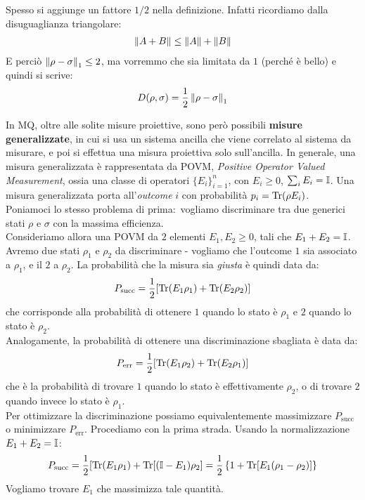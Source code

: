 \documentclass[../../InformazioneQuantistica.tex]{subfiles}
\begin{document}
Spesso si aggiunge un fattore $1/2$ nella definizione. Infatti ricordiamo dalla disuguaglianza triangolare:
\begin{align*}
\left\lVert A + B\right\rVert \leq \left\lVert A\right\rVert + \left\lVert B\right\rVert
\end{align*}
E perciò $\left\lVert\rho- \sigma\right\rVert_1 \leq 2$, ma vorremmo che sia limitata da $1$ (perché è bello) e quindi si scrive:
\begin{align*}
D(\rho, \sigma) = \frac{1}{2}\left\lVert\rho- \sigma\right\rVert_1
\end{align*}

In MQ, oltre alle solite misure proiettive, sono però possibili \textbf{misure generalizzate}, in cui si usa un sistema ancilla che viene correlato al sistema da misurare, e poi si effettua una misura proiettiva solo sull'ancilla. In generale, una misura generalizzata è rappresentata da POVM, \textit{Positive Operator Valued Measurement}, ossia una classe di operatori $\{E_i\}_{i=1}^n$, con $E_i\geq 0$, $\sum_i E_i = \mathbb{I}$. Una misura generalizzata porta all'\textit{outcome} $i$ con probabilità $p_i = \operatorname{Tr}(\rho E_i)$.\\
Poniamoci lo stesso problema di prima:\ vogliamo discriminare tra due generici stati $\rho$ e $\sigma$ con la massima efficienza.\\

Consideriamo allora una POVM da $2$ elementi $E_1, E_2 \geq 0$, tali che $E_1 + E_2 = \mathbb{I}$. Avremo due stati $\rho_1$ e $\rho_2$ da discriminare - vogliamo che l'outcome $1$ sia associato a $\rho_1$, e il $2$ a $\rho_2$. La probabilità che la misura sia \textit{giusta} è quindi data da:
\begin{align*}
P_{\mathrm{succ}} = \frac{1}{2}[ \operatorname{Tr}(E_1 \rho_1) + \operatorname{Tr}(E_2 \rho_2)]
\end{align*}
che corrisponde alla probabilità di ottenere $1$ quando lo stato è $\rho_1$ e $2$ quando lo stato è $\rho_2$.\\
Analogamente, la probabilità di ottenere una discriminazione sbagliata è data da:
\begin{align*}
P_{\mathrm{err}} = \frac{1}{2}[\operatorname{Tr}(E_1 \rho_2) + \operatorname{Tr}(E_2 \rho_1 ) ]
\end{align*}
che è la probabilità di trovare $1$ quando lo stato è effettivamente $\rho_2$, o di trovare $2$ quando invece lo stato è $\rho_1$.\\
Per ottimizzare la discriminazione possiamo equivalentemente massimizzare $P_{\mathrm{succ}}$ o minimizzare $P_{\mathrm{err}}$. Procediamo con la prima strada. Usando la normalizzazione $E_1 + E_2 = \mathbb{I}$:
\begin{align*}
P_{\mathrm{succ}} = \frac{1}{2}[\operatorname{Tr}(E_1 \rho_1) + \operatorname{Tr}[(\mathbb{I}-E_1) \rho_2 ] = \frac{1}{2} \left \{
1+\operatorname{Tr}[E_1(\rho_1-\rho_2)]\right\}
\end{align*}
Vogliamo trovare $E_1$ che massimizza tale quantità.\\
\end{document}
